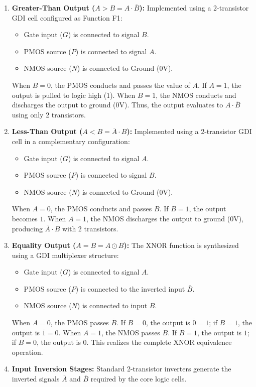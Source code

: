 \documentclass[12pt,a4paper,oneside]{report}
\begin{document}
\begin{enumerate}
\item \textbf{Greater-Than Output ($A>B = A \cdot \overline{B}$):}
Implemented using a 2-transistor GDI cell configured as Function F1:
\begin{itemize}
\item Gate input ($G$) is connected to signal $B$.
\item PMOS source ($P$) is connected to signal $A$.
\item NMOS source ($N$) is connected to Ground ($0\text{V}$).
\end{itemize}
When $B=0$, the PMOS conducts and passes the value of $A$. If $A=1$, the output is pulled to logic high ($1$). When $B=1$, the NMOS conducts and discharges the output to ground ($0\text{V}$). Thus, the output evaluates to $A \cdot \overline{B}$ using only 2 transistors.

\item \textbf{Less-Than Output ($A<B = \overline{A} \cdot B$):}
Implemented using a 2-transistor GDI cell in a complementary configuration:
\begin{itemize}
\item Gate input ($G$) is connected to signal $A$.
\item PMOS source ($P$) is connected to signal $B$.
\item NMOS source ($N$) is connected to Ground ($0\text{V}$).
\end{itemize}
When $A=0$, the PMOS conducts and passes $B$. If $B=1$, the output becomes $1$. When $A=1$, the NMOS discharges the output to ground ($0\text{V}$), producing $\overline{A} \cdot B$ with 2 transistors.

\item \textbf{Equality Output ($A=B = A \odot B$):}
The XNOR function is synthesized using a GDI multiplexer structure:
\begin{itemize}
\item Gate input ($G$) is connected to signal $A$.
\item PMOS source ($P$) is connected to the inverted input $\overline{B}$.
\item NMOS source ($N$) is connected to input $B$.
\end{itemize}
When $A=0$, the PMOS passes $\overline{B}$. If $B=0$, the output is $\overline{0}=1$; if $B=1$, the output is $\overline{1}=0$. When $A=1$, the NMOS passes $B$. If $B=1$, the output is $1$; if $B=0$, the output is $0$. This realizes the complete XNOR equivalence operation.

\item \textbf{Input Inversion Stages:}
Standard 2-transistor inverters generate the inverted signals $\overline{A}$ and $\overline{B}$ required by the core logic cells.
\end{enumerate}
\end{document}
